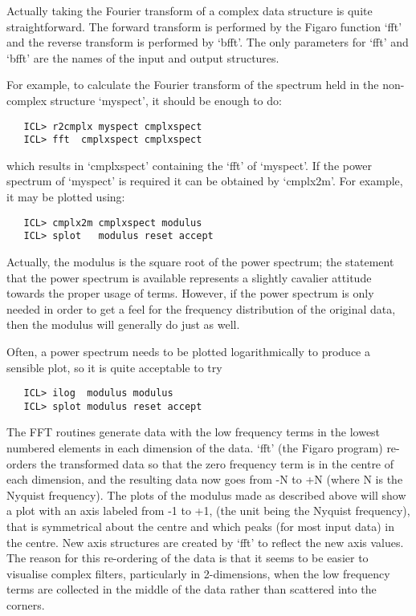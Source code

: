    Actually taking the Fourier transform of a complex data structure is
   quite straightforward.  The forward transform is performed by the
   Figaro function `fft' and the reverse transform is performed by
   `bfft'.  The only parameters for `fft' and `bfft' are the names of
   the input and output structures.

   For example, to calculate the Fourier transform of the spectrum
   held in the non-complex structure `myspect', it should be enough to
   do:

\begin{verbatim}
   ICL> r2cmplx myspect cmplxspect
   ICL> fft  cmplxspect cmplxspect
\end{verbatim}

   which results in `cmplxspect' containing the `fft' of `myspect'.  If the
   power spectrum of `myspect' is required it can be obtained by
   `cmplx2m'. For example, it may be plotted using:

\begin{verbatim}
   ICL> cmplx2m cmplxspect modulus
   ICL> splot   modulus reset accept
\end{verbatim}

   Actually, the modulus is the square root of the power spectrum; the
   statement that the power spectrum is available represents a slightly
   cavalier attitude towards the proper usage of terms.  However, if the
   power spectrum is only needed in order to get a feel for the
   frequency distribution of the original data, then the modulus will
   generally do just as well.

   Often, a power spectrum needs to be plotted logarithmically to
   produce a sensible plot, so it is quite acceptable to try

\begin{verbatim}
   ICL> ilog  modulus modulus
   ICL> splot modulus reset accept
\end{verbatim}

   The FFT routines generate data with the low frequency terms in
   the lowest numbered elements in each dimension of the data. `fft'
   (the Figaro program) re-orders the transformed data so that the zero
   frequency term is in the centre of each dimension, and the resulting
   data now goes from -N to +N (where N is the Nyquist frequency).  The
   plots of the modulus made as described above will show a plot with an
   axis labeled from -1 to +1, (the unit being the Nyquist frequency),
   that is symmetrical about the centre and which peaks (for most input
   data) in the centre.  New axis structures are created by `fft' to
   reflect the new axis values.  The reason for this re-ordering of the
   data is that it seems to be easier to visualise complex filters,
   particularly in 2-dimensions, when the low frequency terms are
   collected in the middle of the data rather than scattered into the
   corners.

